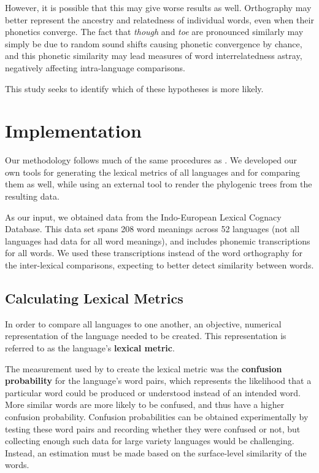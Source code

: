 \documentclass[10pt,a4]{article}
\begin{document}
However, it is possible that this may give worse results as well.  Orthography may better represent the ancestry and relatedness of individual words, even when their phonetics converge.  The fact that \textit{though} and \textit{toe} are pronounced similarly may simply be due to random sound shifts causing phonetic convergence by chance, and this phonetic similarity may lead measures of word interrelatedness astray, negatively affecting intra-language comparisons. 

This study seeks to identify which of these hypotheses is more likely.

\section{Implementation}

Our methodology follows much of the same procedures as .  We developed our own tools for generating the lexical metrics of all languages and for comparing them as well, while using an external tool to render the phylogenic trees from the resulting data.

As our input, we obtained data from the Indo-European Lexical Cognacy Database.  This data set spans 208 word meanings across 52 languages (not all languages had data for all word meanings), and includes phonemic transcriptions for all words.  We used these transcriptions instead of the word orthography for the inter-lexical comparisons, expecting to better detect similarity between words.

\subsection{Calculating Lexical Metrics}

In order to compare all languages to one another, an objective, numerical representation of the language needed to be created.  This representation is referred to as the language's \textbf{lexical metric}.

The measurement used by  to create the lexical metric was the \textbf{confusion probability} for the language's word pairs, which represents the likelihood that a particular word could be produced or understood instead of an intended word.  More similar words are more likely to be confused, and thus have a higher confusion probability.  Confusion probabilities can be obtained experimentally by testing these word pairs and recording whether they were confused or not, but collecting enough such data for large variety languages would be challenging.  Instead, an estimation must be made based on the surface-level similarity of the words.
\end{document}
